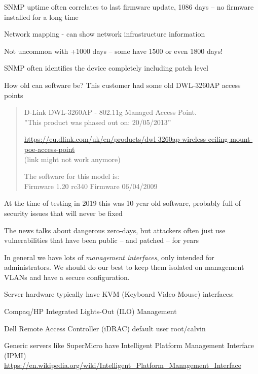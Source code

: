 \documentclass[Screen16to9,17pt]{foils}
\begin{document}
\begin{list2}
\item SNMP uptime often correlates to last firmware update, 1086 days -- no firmware installed for a long time
\item Network mapping - can show network infrastructure information
\item Not uncommon with +1000 days -- some have 1500 or even 1800 days!
\item SNMP often identifies the device completely including patch level
\end{list2}





How old can software be? This customer had some old DWL-3260AP access points

\begin{quote}
D-Link DWL-3260AP - 802.11g Managed Access Point.\\
”This product was phased out on: 20/05/2013”

\url{https://eu.dlink.com/uk/en/products/dwl-3260ap-wireless-ceiling-mount-poe-access-point}\\
 (link might not work anymore)

The software for this model is:\\
Firmware 1.20 rc340 Firmware 06/04/2009
\end{quote}

\vskip 2cm
\begin{list2}
\item At the time of testing in 2019 this was 10 year old software, probably full of security issues that will never be fixed
\item The news talks about dangerous zero-days, but attackers often just use vulnerabilities that have been public -- and patched -- for years
\end{list2}



In general we have lots of \emph{management interfaces}, only intended for administrators. We should do our best to keep them isolated on management VLANs and have a secure configuration.

Server hardware typically have KVM (Keyboard Video Mouse) interfaces:
\begin{list2}
\item Compaq/HP Integrated Lights-Out (ILO) Management
\item Dell Remote Access Controller (iDRAC) default user root/calvin
\item Generic servers like SuperMicro have Intelligent Platform Management Interface (IPMI)\\
{\footnotesize\url{https://en.wikipedia.org/wiki/Intelligent_Platform_Management_Interface}}
\end{list2}
\end{document}
